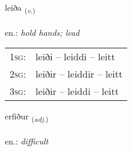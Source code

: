 \documentclass[frontgrid, backgrid]{flacards}\usepackage[]{graphicx}\usepackage[]{xcolor}
\begin{document}
\renewcommand{\flhead}{\vskip5pt \fboxsep=0pt {\small\bfseries\footnotesize Sagnorð | Verb}}
\renewcommand{\fcfoot}{\vskip5pt \fboxsep=0pt \hspace{2pt}{\small\bfseries\footnotesize 1K}}

\renewcommand{\blhead}{\vskip5pt {\small\bfseries\footnotesize Sagnorð | Verb }}
\renewcommand{\bcfoot}{\vskip5pt \hspace{2pt}{\small\bfseries\footnotesize 1K}}


{leiða \small{\textsubscript{(\textit{v.})}} \\[1ex] %
\textphonetic{[leiːða]} \\
en.: \emph{hold hands; lead} \\  [2ex]
\renewcommand*{\arraystretch}{0.8}
\begin{tabular}{p{1cm}l}
\textsc{1sg}: & leiði -- leiddi -- leitt \\ 
\textsc{2sg}: & leiðir -- leiddir -- leitt \\ 
\textsc{3sg}: & leiðir -- leiddi -- leitt \\ 
\end{tabular}
}

\renewcommand{\flhead}{\vskip5pt \fboxsep=0pt {\small\bfseries\footnotesize Lýsingarorð | Adjective}}
\renewcommand{\fcfoot}{\vskip5pt \fboxsep=0pt \hspace{2pt}{\small\bfseries\footnotesize 1K}}

\renewcommand{\blhead}{\vskip5pt {\small\bfseries\footnotesize Lýsingarorð | Adjective }}
\renewcommand{\bcfoot}{\vskip5pt \hspace{2pt}{\small\bfseries\footnotesize 1K}}


{erfiður \small{\textsubscript{(\textit{adj.})}} \\[1ex] %
\textphonetic{[ɛrvɪðʏr]} \\
en.: \emph{difficult} \\  [2ex]
\renewcommand*{\arraystretch}{0.8}
}
\end{document}
